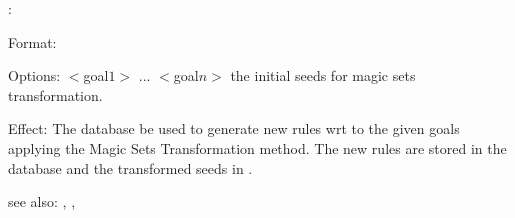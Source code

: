 :

Format: 

Options: $<$goal$1>$ ... $<$goal$n>$ the initial seeds for magic sets transformation.

Effect: The database  be used to generate new rules wrt to the 
	given goals applying the Magic Sets Transformation method. The new rules
	are stored in the database  and the transformed seeds in 
	.

see also: , ,  


